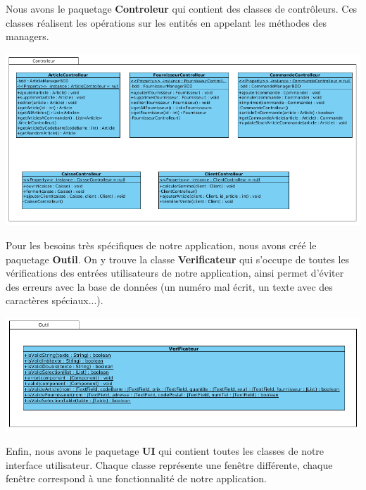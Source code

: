 Nous avons le paquetage \textbf{Controleur} qui contient des classes de contrôleurs. Ces classes réalisent les opérations sur les entités en appelant les méthodes des managers.

\begin{center}
\includegraphics[width=14cm]{./Conception/controlleur}
\end{center}

Pour les besoins très spécifiques de notre application, nous avons créé le paquetage \textbf{Outil}. On y trouve la classe \textbf{Verificateur} qui s'occupe de toutes les vérifications des entrées utilisateurs de notre application, ainsi permet d'éviter des erreurs avec la base de données (un numéro mal écrit, un texte avec des caractères spéciaux...).

\begin{center}
\includegraphics[width=14cm]{./Conception/outil}
\end{center}

Enfin, nous avons le paquetage \textbf{UI} qui contient toutes les classes de notre interface utilisateur. Chaque classe représente une fenêtre différente, chaque fenêtre correspond à une fonctionnalité de notre application.

